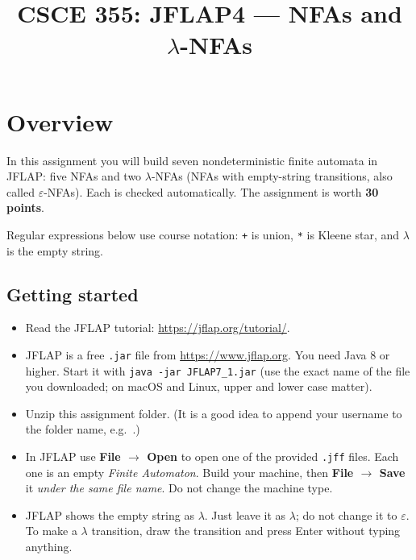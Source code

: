 \documentclass[11pt]{article}
\title{CSCE 355: JFLAP4 --- NFAs and $\lambda$-NFAs}
\author{}
\date{}
\newcommand{\fn}[1]{\texttt{\detokenize{#1}}}
\newcommand{\re}[1]{\texttt{#1}}
\begin{document}
\maketitle

\section*{Overview}

In this assignment you will build seven nondeterministic finite automata in JFLAP: five NFAs
and two $\lambda$-NFAs (NFAs with empty-string transitions, also called $\varepsilon$-NFAs).
Each is checked automatically. The assignment is worth \textbf{30 points}.

Regular expressions below use course notation: \re{+} is union, \re{*} is Kleene star, and
$\lambda$ is the empty string.

\subsection*{Getting started}

\begin{itemize}
  \item Read the JFLAP tutorial: \url{https://jflap.org/tutorial/}.
  \item JFLAP is a free \texttt{.jar} file from \url{https://www.jflap.org}. You need
        Java 8 or higher. Start it with \texttt{java -jar JFLAP7\_1.jar} (use the exact name of
        the file you downloaded; on macOS and Linux, upper and lower case matter).
  \item Unzip this assignment folder. (It is a good idea to append your username to the
        folder name, e.g.\ \fn{JFLAP4_jsmith}.)
  \item In JFLAP use \textbf{File $\to$ Open} to open one of the provided \texttt{.jff}
        files. Each one is an empty \emph{Finite Automaton}. Build your machine, then
        \textbf{File $\to$ Save} it \emph{under the same file name}. Do not change the
        machine type.
  \item JFLAP shows the empty string as $\lambda$. Just leave it as $\lambda$; do not change it
        to $\varepsilon$. To make a $\lambda$ transition, draw the transition and press Enter
        without typing anything.
\end{itemize}
\end{document}
